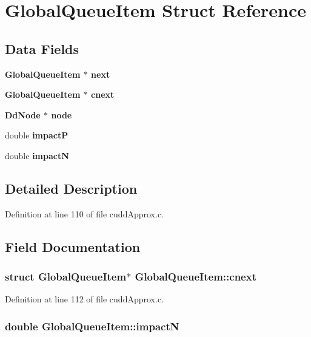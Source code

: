 \section{Global\-Queue\-Item Struct Reference}
\label{structGlobalQueueItem}
\subsection*{Data Fields}
\begin{CompactItemize}
\item 
\bf{Global\-Queue\-Item} $\ast$ \bf{next}
\item 
\bf{Global\-Queue\-Item} $\ast$ \bf{cnext}
\item 
\bf{Dd\-Node} $\ast$ \bf{node}
\item 
double \bf{impact\-P}
\item 
double \bf{impact\-N}
\end{CompactItemize}


\subsection{Detailed Description}




Definition at line 110 of file cudd\-Approx.c.

\subsection{Field Documentation}
\subsubsection{\setlength{\rightskip}{0pt plus 5cm}struct \bf{Global\-Queue\-Item}$\ast$ \bf{Global\-Queue\-Item::cnext}}\label{structGlobalQueueItem_d6ddac94090a3344165f23ba0d519027}




Definition at line 112 of file cudd\-Approx.c.
\subsubsection{\setlength{\rightskip}{0pt plus 5cm}double \bf{Global\-Queue\-Item::impact\-N}}\label{structGlobalQueueItem_60164a006b1d4d2d6f50d4948058e857}





